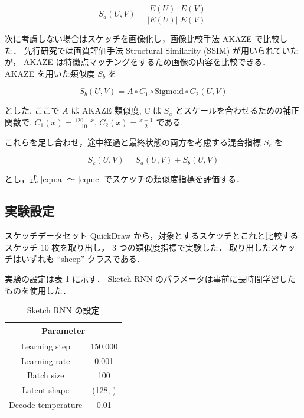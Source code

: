 \documentclass[twocolumn]{jarticle}     %
\begin{document}
\begin{equation}
  \label{equ:a}
  S_a(U, V) = \frac{E(U) \cdot E(V)}{|E(U)| |E(V)|}
\end{equation}


次に考慮しない場合はスケッチを画像化し，画像比較手法 AKAZE で比較した．
先行研究では画質評価手法 Structural Similarity (SSIM) が用いられていたが，
AKAZE は特徴点マッチングをするため画像の内容を比較できる．
AKAZE を用いた類似度 $S_b$ を

\begin{equation}
  \label{equ:b}
  S_b(U, V) = A \circ C_1 \circ \mathrm{Sigmoid} \circ C_2 (U, V)
\end{equation}

とした.
ここで $A$ は AKAZE 類似度, C は $S_a$ とスケールを合わせるための補正関数で, $C_1(x) = \frac{120 - x}{10}$, $C_2(x) = \frac{x + 1}{2}$ である.


これらを足し合わせ，途中経過と最終状態の両方を考慮する混合指標 $S_c$ を

\begin{equation}
  \label{equ:c}
  S_c(U, V) = S_a(U, V) + S_b(U, V)
\end{equation}

とし，式 \ref{equ:a} ～ \ref{equ:c} でスケッチの類似度指標を評価する．

\subsection{実験設定}
スケッチデータセット QuickDraw から，対象とするスケッチとこれと比較するスケッチ 10 枚を取り出し，
3 つの類似度指標で実験した．
取り出したスケッチはいずれも “sheep” クラスである．

実験の設定は表 \ref{tab:setting1} に示す．
Sketch RNN のパラメータは事前に長時間学習したものを使用した．

\begin{table}[tb]
  \begin{center}
    \caption{Sketch RNN の設定}
    \begin{tabular}{cc} \hline
      \multicolumn{2}{c}{Parameter}  \\ \hline
      Learning step & 150,000 \\
      Learning rate & 0.001 \\
      Batch size & 100 \\
      Latent shape & (128, ) \\
      Decode temperature & 0.01 \\ \hline
    \end{tabular}
    \label{tab:setting1}
  \end{center}
\end{table}
\end{document}
